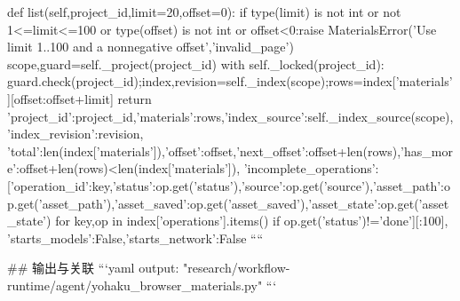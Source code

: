     def list(self,project_id,limit=20,offset=0):
        if type(limit) is not int or not 1<=limit<=100 or type(offset) is not int or offset<0:raise MaterialsError('Use limit 1..100 and a nonnegative offset','invalid_page')
        scope,guard=self._project(project_id)
        with self._locked(project_id):
            guard.check(project_id);index,revision=self._index(scope);rows=index['materials'][offset:offset+limit]
            return {'project_id':project_id,'materials':rows,'index_source':self._index_source(scope),'index_revision':revision,
                'total':len(index['materials']),'offset':offset,'next_offset':offset+len(rows),'has_more':offset+len(rows)<len(index['materials']),
                'incomplete_operations':[{'operation_id':key,'status':op.get('status'),'source':op.get('source'),'asset_path':op.get('asset_path'),'asset_saved':op.get('asset_saved'),'asset_state':op.get('asset_state')} for key,op in index['operations'].items() if op.get('status')!='done'][:100],
                'starts_models':False,'starts_network':False}
````

## 输出与关联
```yaml
output: "research/workflow-runtime/agent/yohaku_browser_materials.py"
```
